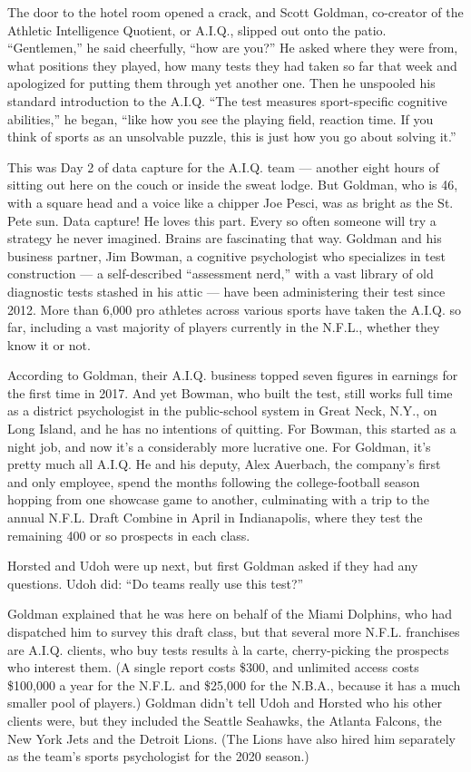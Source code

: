 The door to the hotel room opened a crack, and Scott Goldman, co-creator
of the Athletic Intelligence Quotient, or A.I.Q., slipped out onto the
patio. ``Gentlemen,'' he said cheerfully, ``how are you?'' He asked
where they were from, what positions they played, how many tests they
had taken so far that week and apologized for putting them through yet
another one. Then he unspooled his standard introduction to the A.I.Q.
``The test measures sport-specific cognitive abilities,'' he began,
``like how you see the playing field, reaction time. If you think of
sports as an unsolvable puzzle, this is just how you go about solving
it.''

This was Day 2 of data capture for the A.I.Q. team --- another eight
hours of sitting out here on the couch or inside the sweat lodge. But
Goldman, who is 46, with a square head and a voice like a chipper Joe
Pesci, was as bright as the St. Pete sun. Data capture! He loves this
part. Every so often someone will try a strategy he never imagined.
Brains are fascinating that way. Goldman and his business partner, Jim
Bowman, a cognitive psychologist who specializes in test construction
--- a self-described ``assessment nerd,'' with a vast library of old
diagnostic tests stashed in his attic --- have been administering their
test since 2012. More than 6,000 pro athletes across various sports have
taken the A.I.Q. so far, including a vast majority of players currently
in the N.F.L., whether they know it or not.

According to Goldman, their A.I.Q. business topped seven figures in
earnings for the first time in 2017. And yet Bowman, who built the test,
still works full time as a district psychologist in the public-school
system in Great Neck, N.Y., on Long Island, and he has no intentions of
quitting. For Bowman, this started as a night job, and now it's a
considerably more lucrative one. For Goldman, it's pretty much all
A.I.Q. He and his deputy, Alex Auerbach, the company's first and only
employee, spend the months following the college-football season hopping
from one showcase game to another, culminating with a trip to the annual
N.F.L. Draft Combine in April in Indianapolis, where they test the
remaining 400 or so prospects in each class.

Horsted and Udoh were up next, but first Goldman asked if they had any
questions. Udoh did: ``Do teams really use this test?''

Goldman explained that he was here on behalf of the Miami Dolphins, who
had dispatched him to survey this draft class, but that several more
N.F.L. franchises are A.I.Q. clients, who buy tests results à la carte,
cherry-picking the prospects who interest them. (A single report costs
\$300, and unlimited access costs \$100,000 a year for the N.F.L. and
\$25,000 for the N.B.A., because it has a much smaller pool of players.)
Goldman didn't tell Udoh and Horsted who his other clients were, but
they included the Seattle Seahawks, the Atlanta Falcons, the New York
Jets and the Detroit Lions. (The Lions have also hired him separately as
the team's sports psychologist for the 2020 season.)

